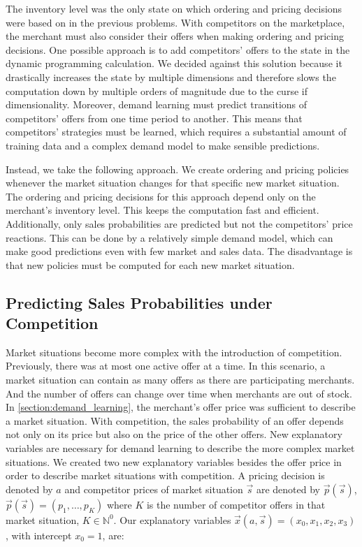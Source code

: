The inventory level was the only state on which ordering and pricing decisions were based on in the previous problems.
With competitors on the marketplace, the merchant must also consider their offers when making ordering and pricing decisions.
One possible approach is to add competitors' offers to the state in the dynamic programming calculation.
We decided against this solution because it drastically increases the state by multiple dimensions and therefore slows the computation down by multiple orders of magnitude due to the curse if dimensionality.
Moreover, demand learning must predict transitions of competitors' offers from one time period to another.
This means that competitors' strategies must be learned, which requires a substantial amount of training data and a complex demand model to make sensible predictions.

Instead, we take the following approach.
We create ordering and pricing policies whenever the market situation changes for that specific new market situation.
The ordering and pricing decisions for this approach depend only on the merchant's inventory level.
This keeps the computation fast and efficient.
Additionally, only sales probabilities are predicted but not the competitors' price reactions.
This can be done by a relatively simple demand model, which can make good predictions even with few market and sales data.
The disadvantage is that new policies must be computed for each new market situation.

\subsection{Predicting Sales Probabilities under Competition}

Market situations become more complex with the introduction of competition.
Previously, there was at most one active offer at a time.
In this scenario, a market situation can contain as many offers as there are participating merchants.
And the number of offers can change over time when merchants are out of stock.
In \cref{section:demand_learning}, the merchant's offer price was sufficient to describe a market situation.
With competition, the sales probability of an offer depends not only on its price but also on the price of the other offers.
New explanatory variables are necessary for demand learning to describe the more complex market situations.
We created two new explanatory variables besides the offer price in order to describe market situations with competition.
A pricing decision is denoted by $a$ and competitor prices of market situation $\vec{s}$ are denoted by $\vec{p}(\vec{s})$, $\vec{p}(\vec{s}) = (p_1, \ldots, p_K)$ where $K$ is the number of competitor offers in that market situation, $K \in \mathbb{N}^0$.
Our explanatory variables $\vec{x}(a, \vec{s}) = (x_0, x_1, x_2, x_3)$, with intercept $x_0=1$, are:

